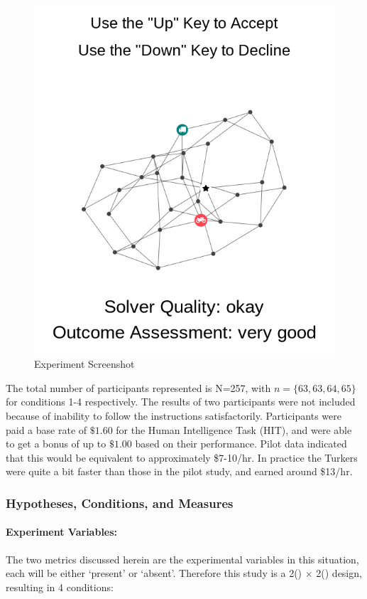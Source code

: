        \begin{figure}[tb]
            \centering
            \includegraphics[width=0.8\linewidth]{Figures/experiment_screenshot}
            \caption{Experiment Screenshot}
            \label{fig:screenshot}
        \end{figure}

    The total number of participants represented is N=257, with $n=\{63,63,64,65\}$ for conditions 1-4 respectively. The results of two participants were not included because of inability to follow the instructions satisfactorily. Participants were paid a base rate of $\$1.60$ for the Human Intelligence Task (HIT), and were able to get a bonus of up to $\$1.00$ based on their performance. Pilot data indicated that this would be equivalent to approximately \$7-10/hr. In practice the Turkers were quite a bit faster than those in the pilot study, and earned around \$13/hr.

    \subsubsection{Hypotheses, Conditions, and Measures} \label{sec:hyp_cond_meas}
    \paragraph{Experiment Variables:}
    The two \famsec{} metrics discussed herein are the experimental variables in this situation, each will be either `present' or `absent'. Therefore this study is a 2(\xQ) $\times$ 2(\xO) design, resulting in 4 conditions:


